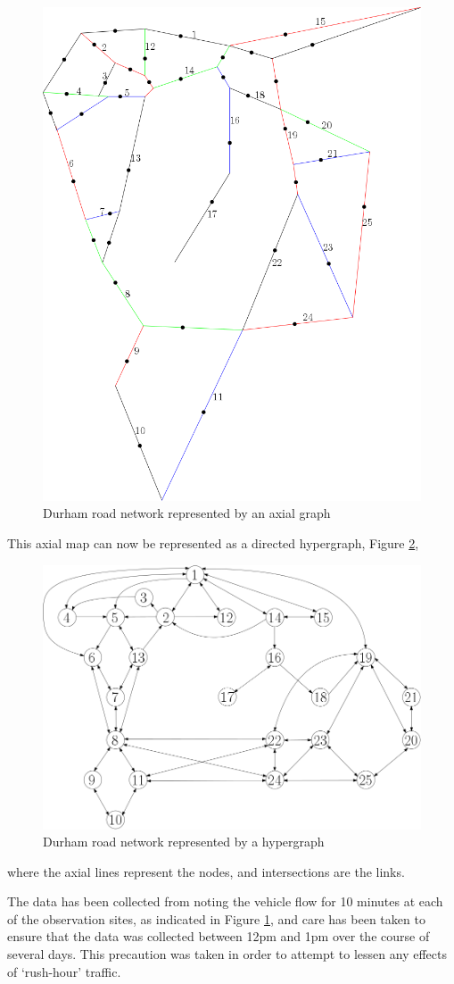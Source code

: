 \documentclass[11pt]{report}
\begin{document}
\begin{figure}
\centering
\includegraphics[width=0.75\linewidth]{axial_marked.png}
\caption{Durham road network represented by an axial graph}
\label{fig:durham axial}
\end{figure}
This axial map can now be represented as a directed hypergraph, Figure \ref{fig:durham graph},
\begin{figure}
\centering
\includegraphics[width=0.75\linewidth]{ipe_durham.png}
\caption{Durham road network represented by a hypergraph}
\label{fig:durham graph}
\end{figure}
where the axial lines represent the nodes, and intersections are the links. 

The data has been collected from noting the vehicle flow for 10 minutes at each of the observation sites, as indicated in Figure \ref{fig:durham axial}, and care has been taken to ensure that the data was collected between 12pm and 1pm over the course of several days. This precaution was taken in order to attempt to lessen any effects of `rush-hour' traffic.
\FloatBarrier
\end{document}
